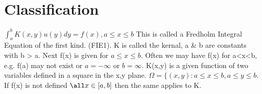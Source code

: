 \documentclass[10pt, oneside]{article}
\begin{document}
\section{Classification}
$\int_{a}^{b}K(x,y)u(y)dy = f(x) , a \leq x \leq b$ This is called a Fredholm Integral Equation of the first kind. (FIE1). K is called the kernal, a & b are constants with b > a. Next f(x) is given for $a \leq x \leq b$. Often we may have f(x) for a<x<b, e.g. f(a) may not exist or $a = -\infty$ or $b = \infty$. K(x,y) is a given function of two variables defined in a square in the x,y plane. $\Omega = \{(x,y):a\leq x \leq b, a \leq y \leq b$. If f(x) is not defined $\all x \in [a,b]$ then the same applies to K. 
\end{document}
